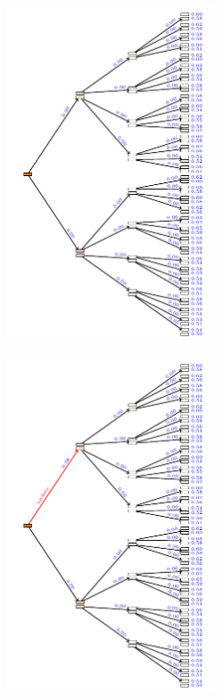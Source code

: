 \documentclass[aspectratio=169]{beamer}
\begin{document}
\begin{landscape}
    \begin{frame}
        \begin{figure}
            \includegraphics[width=0.55\textwidth]{trees/2/tex_tree_0.pdf}
        \end{figure}
    \end{frame}
\end{landscape}

\begin{landscape}
    \begin{frame}
        \begin{figure}
            \includegraphics[width=0.55\textwidth]{trees/2/tex_tree_1.pdf}
        \end{figure}
    \end{frame}
\end{landscape}
\end{document}
